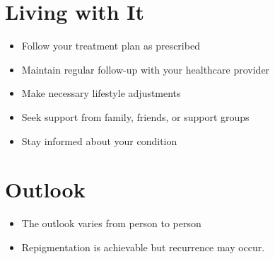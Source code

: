 \section{Living with It}
\begin{itemize}[noitemsep]
  \item Follow your treatment plan as prescribed
  \item Maintain regular follow-up with your healthcare provider
  \item Make necessary lifestyle adjustments
  \item Seek support from family, friends, or support groups
  \item Stay informed about your condition
\end{itemize}
\section{Outlook}
\begin{itemize}[noitemsep]
  \item The outlook varies from person to person
  \item Repigmentation is achievable but recurrence may occur.
\end{itemize}
